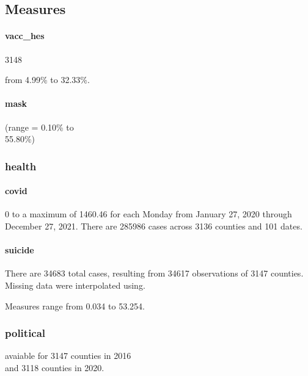 \documentclass[
]{article}
\begin{document}
\hypertarget{measures}{%
\subsection{Measures}\label{measures}}

\hypertarget{vacc_hes}{%
\paragraph{vacc\_hes}\label{vacc_hes}}

3148

from 4.99\% to 32.33\%.

\hypertarget{mask}{%
\paragraph{mask}\label{mask}}

(range = 0.10\% to\\
55.80\%)

\hypertarget{health}{%
\subsubsection{health}\label{health}}

\hypertarget{covid}{%
\paragraph{covid}\label{covid}}

0 to a maximum of 1460.46 for each Monday from January 27, 2020 through
December 27, 2021. There are 285986 cases across 3136 counties and 101
dates.

\hypertarget{suicide}{%
\paragraph{suicide}\label{suicide}}

There are 34683 total cases, resulting from 34617 observations of 3147
counties. Missing data were interpolated using.

Measures range from 0.034 to 53.254.

\hypertarget{political}{%
\subsubsection{political}\label{political}}

avaiable for 3147 counties in 2016\\
and 3118 counties in 2020.
\end{document}
